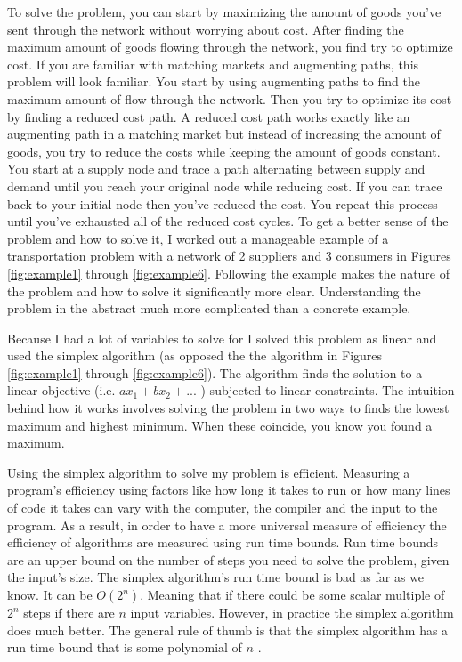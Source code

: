 \documentclass{report}
\begin{document}
To solve the problem, you can start by maximizing the amount of goods you've sent through the network without worrying about cost.  After finding the maximum amount of goods flowing through the network, you find try to optimize cost.  If you are familiar with matching markets and augmenting paths, this problem will look familiar. You start by using augmenting paths to find the maximum amount of flow through the network. Then you try to optimize its cost by finding a reduced cost path. A reduced cost path works exactly like an augmenting path in a matching market but instead of increasing the amount of goods, you try to reduce the costs while keeping the amount of goods constant. You start at a supply node and trace a path alternating between supply and demand until you reach your original node while reducing cost. If you can trace back to your initial node then you've reduced the cost. You repeat this process until you've exhausted all of the reduced cost cycles. To get a better sense of the problem and how to  solve it, I worked out a  manageable example of a transportation problem with a network of 2 suppliers and 3 consumers in Figures \ref{fig:example1} through \ref{fig:example6}. Following the example makes the nature of the problem and how to solve it significantly more clear. Understanding the problem in the abstract much more complicated than a concrete example.

Because I had a lot of variables to solve for I solved this problem as linear and used the simplex algorithm (as opposed the the algorithm in Figures \ref{fig:example1} through \ref{fig:example6}). The algorithm finds the solution to a linear objective (i.e. $a x_1 +b x_2 + ...$ ) subjected to linear constraints. The intuition behind how it works involves solving the problem in two ways to finds the lowest maximum and highest minimum. When these coincide,  you know you found a maximum.

Using the simplex algorithm to solve my problem is efficient. Measuring a program's efficiency using factors like how long it takes to run or how many lines of code it takes can vary with the computer, the compiler and the input to the program. As a result, in order to have a more universal measure of efficiency the efficiency of algorithms are measured using run time bounds. Run time bounds are an upper bound on the number of steps you need to solve the problem, given the input's size.  The simplex algorithm's run time bound is bad as far as we know. It can be $O(2^n)$. Meaning that if there could be some scalar multiple of $2^n$ steps if there are $n$ input variables. However, in practice the simplex algorithm does much better. The general rule of thumb is that the simplex algorithm has a run time bound that is some polynomial of $n$ \cite{Cook}.
\end{document}
